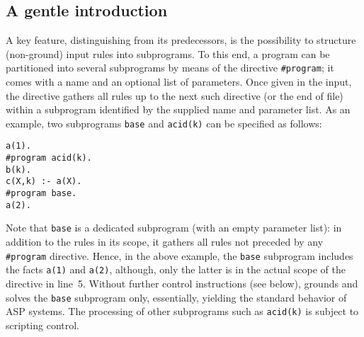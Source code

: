 
\subsection{A gentle introduction}
\label{sec:glance}

A key feature, distinguishing \clingo{} from its predecessors,
is the possibility to structure (non-ground) input rules into subprograms.
To this end,
a program can be partitioned into several subprograms by means of the directive \lstinline{#program};
it comes with a name and an optional list of parameters.
Once given in the input,
the directive gathers all rules up to the next such directive (or the end of file)
within a subprogram identified by the supplied name and parameter list.
%
As an example,
two subprograms \lstinline{base} and \lstinline{acid(k)} can be specified as follows:
%
\begin{lstlisting}[language=clingo]
a(1).
#program acid(k).
b(k).
c(X,k) :- a(X).
#program base.
a(2).
\end{lstlisting}
%
Note that \lstinline{base} is a dedicated subprogram (with an empty parameter list):
in addition to the rules in its scope,
it gathers all rules not preceded by any \lstinline{#program} directive.
Hence, in the above example, the \lstinline{base} subprogram includes the facts \lstinline{a(1)} and \lstinline{a(2)},
although, only the latter is in the actual scope of the directive in line~5.
% 
Without further control instructions (see below),
\clingo{} grounds and solves the \lstinline{base} subprogram only,
essentially, yielding the standard behavior of ASP systems.
The processing of other subprograms such as \lstinline{acid(k)} is subject to scripting control.

